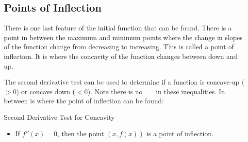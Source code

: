 \subsection*{Points of Inflection}\label{sec:PointsOfInflection}
\begin{multicols}{2}
There is one last feature of the initial function that can be found. There is a point in between the maximum and minimum points where the change in slopes of the function change from decreasing to increasing. This is called a point of inflection. It is where the concavity of the function changes between down and up.\columnbreak
\begin{center}
\end{center}
\end{multicols}

The second derivative test can be used to determine if a function is concave-up ($>0$) or concave down ($<0$). Note there is no $=$ in these inequalities. In between is where the point of inflection can be found:
\begin{tcolorbox}
	Second Derivative Test for Concavity
	\begin{itemize}
		\item If $f''(x)=0$, then the point $(x,f(x))$ is a point of inflection.\\
	\end{itemize}
\end{tcolorbox}


